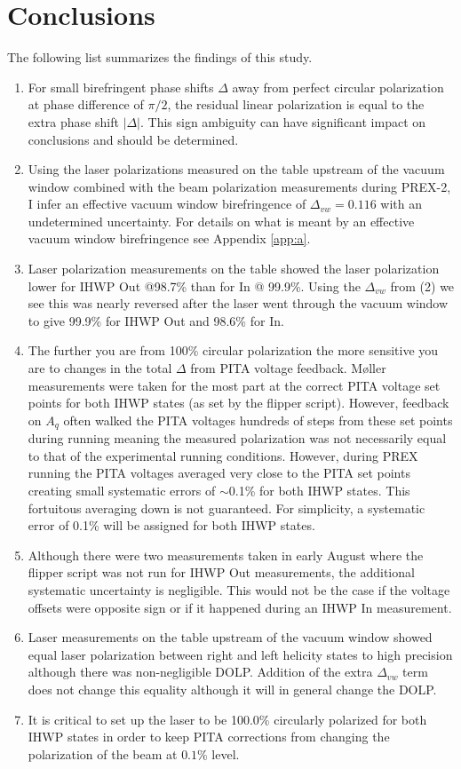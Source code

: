 \documentclass[12pt]{article}
\begin{document}
\section{Conclusions}
The following list summarizes the findings of this study.
\begin{enumerate}
\item{For small birefringent phase shifts $\Delta$ away from perfect circular polarization at phase difference of $\pi/2$, the residual linear polarization is equal to the extra phase shift $\left|\Delta\right|$. This sign ambiguity can have significant impact on conclusions and should  be determined. }
\item{Using the laser polarizations measured on the table upstream of the vacuum window combined with the beam polarization measurements during PREX-2, I infer an effective vacuum window birefringence of $\Delta_{vw}=0.116$ with an undetermined uncertainty. For details on what is meant by an effective vacuum window birefringence see Appendix \ref{app:a}.}
\item{Laser polarization measurements on the table showed the laser polarization lower for IHWP Out @98.7\% than for In @ 99.9\%. Using the $\Delta_{vw}$ from (2) we see this was nearly reversed after the laser went through the vacuum window to give 99.9\% for IHWP Out and 98.6\% for In.}
\item{The further you are from 100\% circular polarization the more sensitive you are to changes in the total $\Delta$ from PITA voltage feedback. M\o ller measurements were taken for the most part at the correct PITA voltage set points for both IHWP states (as set by the flipper script). However, feedback on $A_q$ often walked the PITA voltages hundreds of steps from these set points during running meaning the measured polarization was not necessarily equal to that of the experimental running conditions. However, during PREX running the PITA voltages  averaged very close to the PITA set points creating small systematic errors of $\sim$0.1\% for both IHWP states. This fortuitous averaging down is not guaranteed. For simplicity, a systematic error of 0.1\% will be assigned for both IHWP states.}
\item{Although there were two measurements taken in early August where the flipper script was not run for IHWP Out measurements, the additional systematic uncertainty is negligible. This would not be the case if the voltage offsets were opposite sign or if it happened during an IHWP In measurement.}
\item{Laser measurements on the table upstream of the vacuum window showed equal laser polarization between right and left helicity states to high precision although there was non-negligible DOLP.  Addition of the extra $\Delta_{vw}$ term does not change this equality although it will in general change the DOLP.}
\item{It is critical to set up the laser to be 100.0\% circularly polarized for both IHWP states in order to keep PITA corrections from changing the polarization of the beam at $0.1$\% level.}
\end{enumerate}
\FloatBarrier
\appendix
\end{document}
